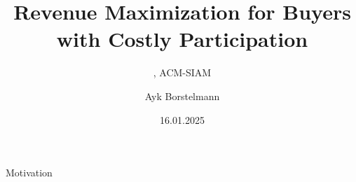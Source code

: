\documentclass{beamer}
\title{Revenue Maximization for Buyers with Costly Participation}
\date{16.01.2025}
\author{Ayk Borstelmann}
\institute{
    Seminar Algorithmic Game Theory
}
\subtitle{
  \cite{primary}, ACM-SIAM
}
\begin{document}
\maketitle
\begin{frame}{Motivation}

  \begin{columns}
    \begin{column}{.3\textwidth}
      \begin{center}
        \resizebox{!}{.45\textwidth}{\faPlane}
      \end{center}
    \end{column}
    \begin{column}{.4\textwidth}
      \begin{center}
        \resizebox{!}{.35\textwidth}{\faUserSlash}
      \end{center}
    \end{column}
    \begin{column}{.3\textwidth}
      \begin{center}
        \resizebox{!}{.5\textwidth}{\faDollarSign}
      \end{center}
    \end{column}
  \end{columns}

\end{frame}
\end{document}
